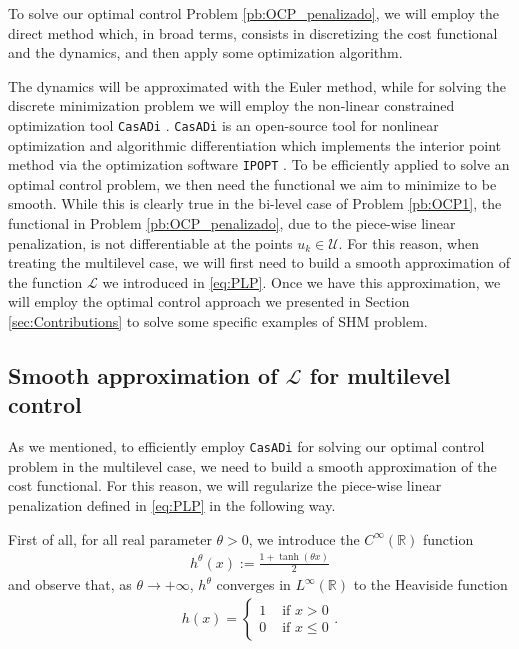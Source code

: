 \documentclass[9pt,shortpaper,twoside,web]{ieeecolor}
\begin{document}
To solve our optimal control Problem \ref{pb:OCP_penalizado}, we will employ the direct method \cite{rao2009survey} which, in broad terms, consists in discretizing the cost functional and the dynamics, and then apply some optimization algorithm. 

The dynamics will be approximated with the Euler method, while for solving the discrete minimization problem we will employ the non-linear constrained optimization tool \texttt{CasADi} \cite{Andersson2019}. \texttt{CasADi} is an open-source tool for nonlinear optimization and algorithmic differentiation which implements the interior point method via the optimization software \texttt{IPOPT} \cite{wachter2006implementation}. To be efficiently applied to solve an optimal control problem, we then need the functional we aim to minimize to be smooth. While this is clearly true in the bi-level case of Problem \ref{pb:OCP1}, the functional in Problem \ref{pb:OCP_penalizado}, due to the piece-wise linear penalization, is not differentiable at the points $u_k\in\mathcal U$. For this reason, when treating the multilevel case, we will first need to build a smooth approximation of the  function $\mathcal L$ we introduced in \eqref{eq:PLP}. Once we have this approximation, we will employ the optimal control approach we presented in Section \ref{sec:Contributions} to solve some specific examples of SHM problem.

\subsection{Smooth approximation of $\mathcal L$ for multilevel control}

As we mentioned, to efficiently employ \texttt{CasADi} for solving our optimal control problem in the multilevel case, we need to build a smooth approximation of the cost functional. For this reason, we will regularize the piece-wise linear penalization defined in \eqref{eq:PLP} in the following way.

First of all, for all real parameter $\theta>0$, we introduce the $C^\infty(\mathbb{R})$ function
\begin{align*}
	\displaystyle h^\theta(x) := \frac{1 + \tanh(\theta x)}{2}
\end{align*}
and observe that, as $\theta\to +\infty$, $h^\theta$ converges in $L^\infty(\mathbb{R})$ to the Heaviside function 
\begin{align*}
	h(x) = \begin{cases}
		1 & \text{ if } x > 0 
		\\
		0 & \text{ if } x \leq 0
	\end{cases}.
\end{align*}
\end{document}
